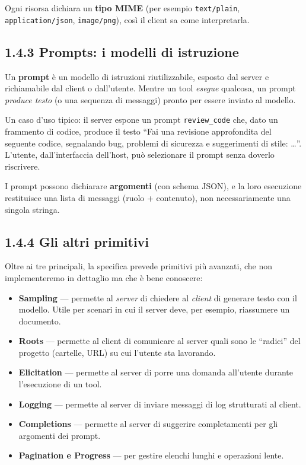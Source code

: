 \documentclass[
  italian,
  10pt,
]{book}
\providecommand{\tightlist}{%
  \setlength{\itemsep}{0pt}\setlength{\parskip}{0pt}}
\begin{document}
Ogni risorsa dichiara un \textbf{tipo MIME} (per esempio
\texttt{text/plain}, \texttt{application/json}, \texttt{image/png}),
così il client sa come interpretarla.

\subsection{1.4.3 Prompts: i modelli di
istruzione}\label{prompts-i-modelli-di-istruzione}

Un \textbf{prompt} è un modello di istruzioni riutilizzabile, esposto
dal server e richiamabile dal client o dall'utente. Mentre un tool
\emph{esegue} qualcosa, un prompt \emph{produce testo} (o una sequenza
di messaggi) pronto per essere inviato al modello.

Un caso d'uso tipico: il server espone un prompt \texttt{review\_code}
che, dato un frammento di codice, produce il testo ``Fai una revisione
approfondita del seguente codice, segnalando bug, problemi di sicurezza
e suggerimenti di stile: \ldots{}''. L'utente, dall'interfaccia
dell'host, può selezionare il prompt senza doverlo riscrivere.

I prompt possono dichiarare \textbf{argomenti} (con schema JSON), e la
loro esecuzione restituisce una lista di messaggi (ruolo + contenuto),
non necessariamente una singola stringa.

\subsection{1.4.4 Gli altri primitivi}\label{gli-altri-primitivi}

Oltre ai tre principali, la specifica prevede primitivi più avanzati,
che non implementeremo in dettaglio ma che è bene conoscere:

\begin{itemize}
\tightlist
\item
  \textbf{Sampling} --- permette al \emph{server} di chiedere al
  \emph{client} di generare testo con il modello. Utile per scenari in
  cui il server deve, per esempio, riassumere un documento.
\item
  \textbf{Roots} --- permette al client di comunicare al server quali
  sono le ``radici'' del progetto (cartelle, URL) su cui l'utente sta
  lavorando.
\item
  \textbf{Elicitation} --- permette al server di porre una domanda
  all'utente durante l'esecuzione di un tool.
\item
  \textbf{Logging} --- permette al server di inviare messaggi di log
  strutturati al client.
\item
  \textbf{Completions} --- permette al server di suggerire completamenti
  per gli argomenti dei prompt.
\item
  \textbf{Pagination e Progress} --- per gestire elenchi lunghi e
  operazioni lente.
\end{itemize}
\end{document}
